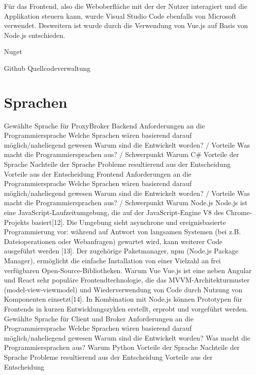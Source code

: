     
    Für das Frontend, also die Weboberfläche mit der der Nutzer interagiert und die Applikation steuern kann, wurde Visual Studio Code ebenfalls von Microsoft verwendet.
    Desweitern ist wurde durch die Verwendung von Vue.js %
    auf Basis von Node.js %
    entschieden.

    Nuget %
    
    Github Quellcodeverwaltung %

\section{Sprachen}
    Gewählte Sprache für ProxyBroker
    Backend
        Anforderungen an die Programmiersprache
        Welche Sprachen wären basierend darauf möglich/naheliegend gewesen
            Warum sind die Entwickelt worden? / Vorteile
            Was macht die Programmiersprachen aus? / Schwerpunkt
        Warum C\#
            Vorteile der Sprache
            Nachteile der Sprache 
            Probleme resultierend aus der Entscheidung
            Vorteile aus der Entscheidung
    Frontend
        Anforderungen an die Programmiersprache
        Welche Sprachen wären basierend darauf möglich/naheliegend gewesen
            Warum sind die Entwickelt worden? / Vorteile
            Was macht die Programmiersprachen aus? / Schwerpunkt
        Warum Node.js
            Node.js ist eine JavaScript-Laufzeitumgebung, die auf der JavaScript-Engine V8 des Chrome-Projekts basiert[12]. Die Umgebung sieht asynchrone und ereignisbasierte Programmierung vor: während auf Antwort von langsamen Systemen (bei z.B. Dateioperationen oder Webanfragen) gewartet wird, kann weiterer Code ausgeführt werden [13]. Der zugehörige Paketmanager, npm (Node.js Package Manager), ermöglicht die einfache Installation von einer Vielzahl an frei verfügbaren Open-Source-Bibliotheken. 
        Warum Vue
            Vue.js ist eine neben Angular und React sehr populäre Frontendtechnologie, die das MVVM-Architekturmuster (model-view-viewmodel) und Wiederverwendung von Code durch Nutzung von Komponenten einsetzt[14]. In Kombination mit Node.js können Prototypen für Frontends in kurzen Entwicklungszyklen erstellt, erprobt und vorgeführt werden.
    Gewählte Sprache für Client und Broker
        Anforderungen an die Programmiersprache
        Welche Sprachen wären basierend darauf möglich/naheliegend gewesen
            Warum sind die Entwickelt worden? 
            Was macht die Programmiersprachen aus?
        Warum Python
            Vorteile der Sprache
            Nachteile der Sprache 
            Probleme resultierend aus der Entscheidung
            Vorteile aus der Entscheidung
     
